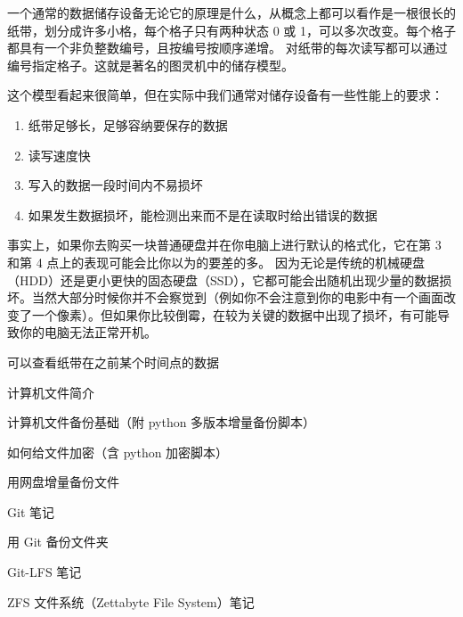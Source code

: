 
\begin{issues}
\issueDraft
\end{issues}

一个通常的数据储存设备无论它的原理是什么，从概念上都可以看作是一根很长的纸带，划分成许多小格，每个格子只有两种状态 0 或 1，可以多次改变。每个格子都具有一个非负整数编号，且按编号按顺序递增。 对纸带的每次读写都可以通过编号指定格子。这就是著名的图灵机中的储存模型。

这个模型看起来很简单，但在实际中我们通常对储存设备有一些性能上的要求：
\begin{enumerate}
\item 纸带足够长，足够容纳要保存的数据
\item 读写速度快
\item 写入的数据一段时间内不易损坏
\item 如果发生数据损坏，能检测出来而不是在读取时给出错误的数据
\end{enumerate}

事实上，如果你去购买一块普通硬盘并在你电脑上进行默认的格式化，它在第 3 和第 4 点上的表现可能会比你以为的要差的多。 因为无论是传统的机械硬盘（HDD）还是更小更快的固态硬盘（SSD），它都可能会出随机出现少量的数据损坏。当然大部分时候你并不会察觉到（例如你不会注意到你的电影中有一个画面改变了一个像素）。但如果你比较倒霉，在较为关键的数据中出现了损坏，有可能导致你的电脑无法正常开机。


可以查看纸带在之前某个时间点的数据

计算机文件简介

计算机文件备份基础（附 python 多版本增量备份脚本）

如何给文件加密（含 python 加密脚本）

用网盘增量备份文件

Git 笔记

用 Git 备份文件夹

Git-LFS 笔记

ZFS 文件系统（Zettabyte File System）笔记
